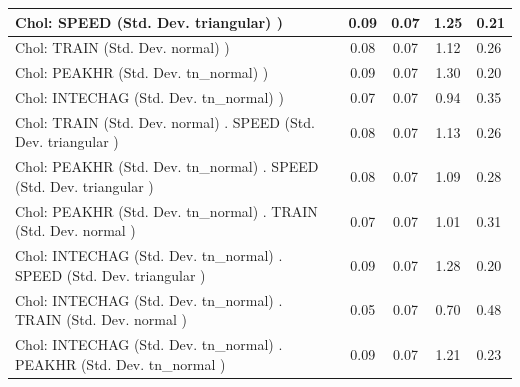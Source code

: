 \begin{table}
\begin{center}
\begin{tabular}{|l|l|c|c|c|l|}
			\hline
			 Chol: SPEED (Std. Dev. triangular) ) &  & 0.09 & 0.07 & 1.25 & 0.21 \\
			\hline
			 Chol: TRAIN (Std. Dev. normal) ) &  & 0.08 & 0.07 & 1.12 & 0.26 \\
			\hline
			 Chol: PEAKHR (Std. Dev. tn_normal) ) &  & 0.09 & 0.07 & 1.30 & 0.20 \\
			\hline
			 Chol: INTECHAG (Std. Dev. tn_normal) ) &  & 0.07 & 0.07 & 0.94 & 0.35 \\
			\hline
			 Chol: TRAIN (Std. Dev. normal) . SPEED (Std. Dev.   triangular ) &  & 0.08 & 0.07 & 1.13 & 0.26 \\
			\hline
			 Chol: PEAKHR (Std. Dev. tn_normal) . SPEED (Std. Dev.   triangular ) &  & 0.08 & 0.07 & 1.09 & 0.28 \\
			\hline
			 Chol: PEAKHR (Std. Dev. tn_normal) . TRAIN (Std. Dev.   normal ) &  & 0.07 & 0.07 & 1.01 & 0.31 \\
			\hline
			 Chol: INTECHAG (Std. Dev. tn_normal) . SPEED (Std. Dev.   triangular ) &  & 0.09 & 0.07 & 1.28 & 0.20 \\
			\hline
			 Chol: INTECHAG (Std. Dev. tn_normal) . TRAIN (Std. Dev.   normal ) &  & 0.05 & 0.07 & 0.70 & 0.48 \\
			\hline
			 Chol: INTECHAG (Std. Dev. tn_normal) . PEAKHR (Std. Dev.   tn_normal ) &  & 0.09 & 0.07 & 1.21 & 0.23 \\
			\hline
		\end{tabular}
	\end{center}
\end{table}